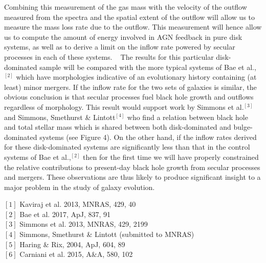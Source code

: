 \documentclass[12pt]{article}
\begin{document}
Combining this measurement of the gas mass with the velocity of the outflow measured from the spectra and the spatial extent of the outflow will allow us to measure the mass loss rate due to the outflow. This measurement will hence allow us to compute the amount of energy involved in AGN feedback in pure disk systems, as well as to derive a limit on the inflow rate powered by secular processes in each of these systems. 
\vspace{0.25em}
 
The results for this particular disk-dominated sample will be compared with the more typical systems of Bae et al.,$^{[2]}$ which have morphologies indicative of an evolutionary history containing (at least) minor mergers. If the inflow rate for the two sets of galaxies is similar, the obvious conclusion is that secular processes fuel black hole growth and outflows regardless of morphology. This result would support work by Simmons et al.$^{[3]}$ and Simmons, Smethurst \& Lintott$^{[4]}$ who find a relation between black hole and total stellar mass which is shared between both disk-dominated and bulge-dominated systems (see Figure 4). On the other hand, if the inflow rates derived for these disk-dominated systems are significantly less than that in the control systems of Bae et al.,$^{[2]}$ then for the first time we will have properly constrained the relative contributions to present-day black hole growth from secular processes and mergers. These observations are thus likely to produce significant insight to a major problem in the study of galaxy evolution. 
\vspace{1.5em}

\newpage

\vspace{0.5em}


\noindent
$[1]$ Kaviraj et al. 2013, MNRAS, 429, 40
\\
$[2]$ Bae et al. 2017, ApJ, 837, 91
\\
$[3]$ Simmons et al. 2013, MNRAS, 429, 2199 
\\
$[4]$ Simmons, Smethurst \& Lintott (submitted to MNRAS)
\\
$[5]$ Haring \& Rix, 2004, ApJ, 604, 89
\\
$[6]$ Carniani et al. 2015, A\&A, 580, 102
\end{document}
